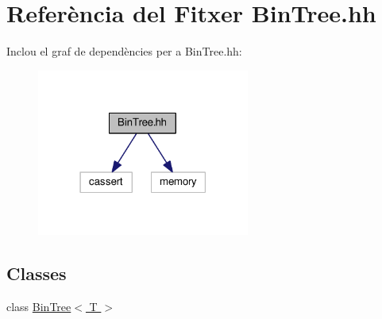 \hypertarget{_bin_tree_8hh}{}\section{Referència del Fitxer Bin\+Tree.\+hh}
\label{_bin_tree_8hh}
Inclou el graf de dependències per a Bin\+Tree.\+hh\+:
\nopagebreak
\begin{figure}[H]
\begin{center}
\leavevmode
\includegraphics[width=198pt]{_bin_tree_8hh__incl}
\end{center}
\end{figure}
\subsection*{Classes}
\begin{DoxyCompactItemize}
\item 
class \hyperlink{class_bin_tree}{Bin\+Tree$<$ T $>$}
\end{DoxyCompactItemize}
